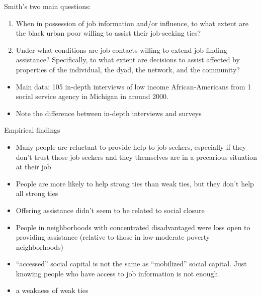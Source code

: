 \documentclass[aspectratio=169]{beamer}
\begin{document}
\begin{frame}

Smith's two main questions:
\begin{enumerate}
\item When in possession of job information and/or influence, to what extent are the black urban poor willing to assist their job-seeking ties? \pause
\item Under what conditions are job contacts willing to extend job-finding assistance? Specifically, to what extent are decisions to assist affected by properties of the individual, the dyad, the network, and the community?
\end{enumerate}


\end{frame}
\begin{frame}

\begin{itemize}
\item Main data: 105 in-depth interviews of low income African-Americans from 1 social service agency in Michigan in around 2000. \pause
\item Note the difference between in-depth interviews and surveys
\end{itemize}

\end{frame}
\begin{frame}

Empirical findings \pause
\begin{itemize}
\item Many people are reluctant to provide help to job seekers, especially if they don't trust those job seekers and they themselves are in a precarious situation at their job \pause
\item People are more likely to help strong ties than weak ties, but they don't help all strong ties \pause
\item Offering assistance didn't seem to be related to social closure \pause
\item People in neighborhoods with concentrated disadvantaged were loss open to providing assistance (relative to those in low-moderate poverty neighborhoods)
\end{itemize}

\end{frame}
\begin{frame}

\begin{itemize}
\item ``accessed'' social capital is not the same as ``mobilized'' social capital.  Just knowing people who have access to job information is not enough. \pause
\item a weakness of weak ties
\end{itemize}


\end{frame}
\end{document}
